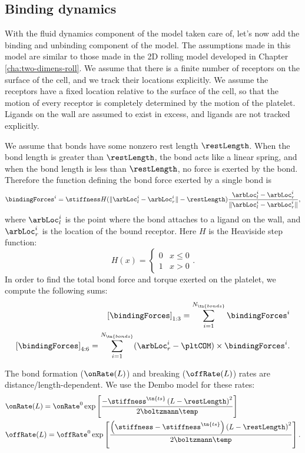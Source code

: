 \subsection{Binding dynamics}
\label{sec:binding-dynamics}

With the fluid dynamics component of the model taken care of, let's
now add the binding and unbinding component of the model. The
assumptions made in this model are similar to those made in the 2D
rolling model developed in Chapter \ref{cha:two-dimens-roll}. We
assume that there is a finite number of receptors on the surface of
the cell, and we track their locations explicitly. We assume the
receptors have a fixed location relative to the surface of the cell,
so that the motion of every receptor is completely determined by the
motion of the platelet. Ligands on the wall are assumed to exist in
excess, and ligands are not tracked explicitly.

We assume that bonds have some nonzero rest length $\restLength$. When
the bond length is greater than $\restLength$, the bond acts like a
linear spring, and when the bond length is less than $\restLength$, no
force is exerted by the bond. Therefore the function defining the bond
force exerted by a single bond is
\begin{equation}
  \label{eq:single-bond-force}
  \bindingForces^i = \stiffness H(\|\arbLoc_l^i - \arbLoc_r^i\| -
  \restLength) \frac{\arbLoc_l^i - \arbLoc_r^i}{\|\arbLoc_l^i -
    \arbLoc_r^i\|},
\end{equation}
where $\arbLoc_l^i$ is the point where the bond attaches to a ligand
on the wall, and $\arbLoc_r^i$ is the location of the bound
receptor. Here $H$ is the Heaviside step function:
\[H(x) =
\begin{cases}
  0 & x \le 0 \\
  1 & x > 0
\end{cases}.\]
In order to find the total bond force and torque exerted on the
platelet, we compute the following sums:
\begin{align}
  \left[\bindingForces\right]_{1:3} = \sum_{i = 1}^{N_\tn{bonds}}
  \bindingForces^i \label{eq:total-bond-force} \\
  \left[\bindingForces\right]_{4:6} = \sum_{i = 1}^{N_\tn{bonds}}
  (\arbLoc_r^i - \pltCOM) \times \bindingForces^i.
\end{align}

The bond formation ($\onRate(L)$) and breaking ($\offRate(L)$) rates
are distance/length-dependent. We use the Dembo model \cite{Dembo1988}
for these rates:
\begin{align}
  &\onRate(L) = \onRate^0 \exp\left[\frac{-\stiffness^\tn{ts} \left(L -
  \restLength \right)^2}{2 \boltzmann \temp}
  \right] \label{eq:dembo-on} \\
  &\offRate(L) = \offRate^0 \exp\left[\frac{\left(\stiffness -
  \stiffness^\tn{ts} \right) \left(L - \restLength \right)^2}{2
  \boltzmann \temp} \right]. \label{eq:dembo-off}
\end{align}

